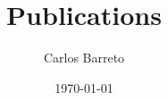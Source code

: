 \documentclass[12pt,onecolumn]{article}
\begin{document}
\title{Publications}
\author{Carlos Barreto
}

\date{\today}


\maketitle
\nocite{*}



{\def\section*#1{}}
\end{document}
